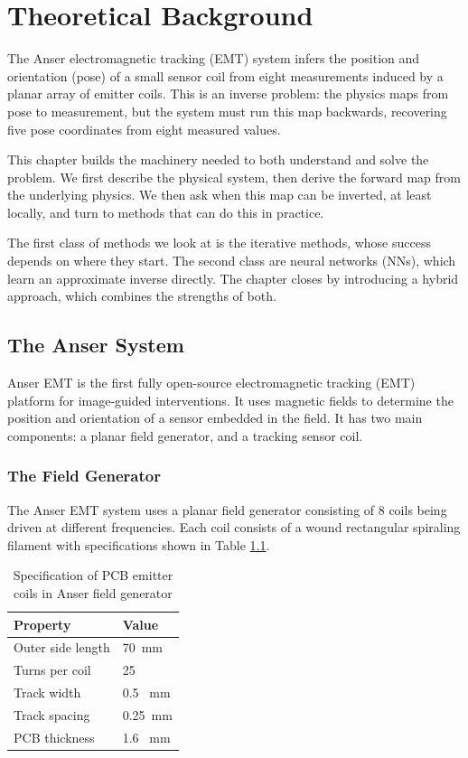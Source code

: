 \chapter{Theoretical Background}
The Anser electromagnetic tracking (EMT) system infers the position and orientation (pose) of a small sensor coil from eight measurements induced by a planar array of emitter coils. This is an inverse problem: the physics maps from pose to measurement, but the system must run this map backwards, recovering five pose coordinates from eight measured values. 

This chapter builds the machinery needed to both understand and solve the problem. We first describe the physical system, then derive the forward map from the underlying physics. We then ask when this map can be inverted, at least locally, and turn to methods that can do this in practice.

The first class of methods we look at is the iterative methods, whose success depends on where they start. The second class are neural networks (NNs), which learn an approximate inverse directly. The chapter closes by introducing a hybrid approach, which combines the strengths of both.

\section{The Anser System}
Anser EMT \cite{jaeger2017} is the first fully open-source electromagnetic tracking (EMT) platform for image-guided interventions. It uses magnetic fields to determine the position and orientation of a sensor embedded in the field. It has two main components: a planar field generator, and a tracking sensor coil. 

\subsection{The Field Generator}
The Anser EMT system uses a planar field generator consisting of 8 coils being driven at different frequencies. Each coil consists of a wound rectangular spiraling filament with specifications shown in Table \ref{tab:coil_spec}.

\begin{table}
  \centering
  \begin{tabular}{ll}
    \toprule 
    Property & Value \\
    \midrule
    Outer side length & 70 \,mm \\
    Turns per coil & 25 \\
    Track width & 0.5 \, mm \\
    Track spacing & 0.25 \,mm \\
    PCB thickness & 1.6 \, mm \\
    \bottomrule
  \end{tabular}
  \caption{Specification of PCB emitter coils in Anser field generator \cite{jaeger2017}}
  \label{tab:coil_spec}
\end{table}

